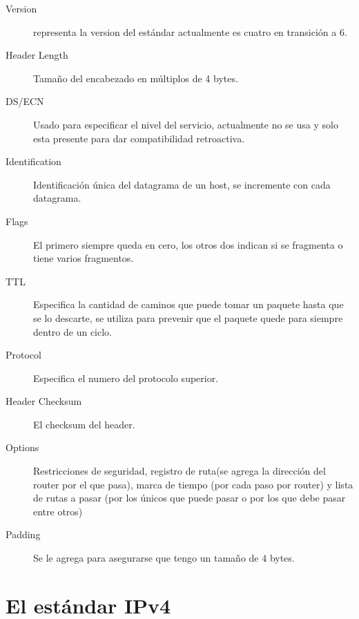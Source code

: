 \documentclass[11pt,a4paper]{article}
\begin{document}
\begin{description}

\item[Version] representa la version del estándar actualmente es cuatro en transición a 6.
\item[Header Length] Tamaño del encabezado en múltiplos de 4 bytes.
\item[DS/ECN] Usado para especificar el nivel del servicio, actualmente no se usa y solo esta
presente para dar compatibilidad retroactiva.
\item[Identification] Identificación única del datagrama de un host, se incremente con cada 
datagrama.
\item[Flags] El primero siempre queda en cero, los otros dos indican si se fragmenta o tiene varios
fragmentos.
\item[TTL] Especifica la cantidad de caminos que puede tomar un paquete hasta que se lo descarte, se
utiliza para prevenir que el paquete quede para siempre dentro de un ciclo.
\item[Protocol] Especifica el numero del protocolo superior.
\item[Header Checksum] El checksum del header.
\item[Options] Restricciones de seguridad, registro de ruta(se agrega la dirección del router por el 
que pasa), marca de tiempo (por cada paso por router) y lista de rutas a pasar (por los únicos que 
puede pasar o por los que debe pasar entre otros)
\item[Padding] Se le agrega para asegurarse que tengo un tamaño de 4 bytes.

\end{description}


\section{El estándar IPv4}
\end{document}
